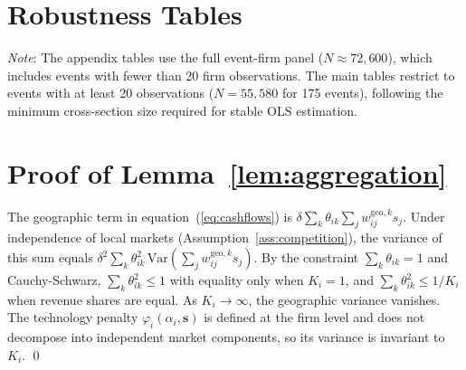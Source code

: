 \documentclass[12pt,a4paper]{article}
\begin{document}




\appendix
\section{Robustness Tables}\label{app:robustness}

\noindent\footnotesize\textit{Note}: The appendix tables use the full event-firm panel ($N \approx 72{,}600$), which includes events with fewer than 20 firm observations. The main tables restrict to events with at least 20 observations ($N = 55{,}580$ for 175 events), following the minimum cross-section size required for stable OLS estimation.\normalsize

\medskip











\section{Proof of Lemma~\ref{lem:aggregation}}\label{app:aggregation_proof}

The geographic term in equation~(\ref{eq:cashflows}) is $\delta \sum_k \theta_{ik} \sum_j w^{\text{geo},k}_{ij} s_j$. Under independence of local markets (Assumption~\ref{ass:competition}), the variance of this sum equals $\delta^2 \sum_k \theta_{ik}^2 \, \text{Var}(\sum_j w^{\text{geo},k}_{ij} s_j)$. By the constraint $\sum_k \theta_{ik} = 1$ and Cauchy-Schwarz, $\sum_k \theta_{ik}^2 \leq 1$ with equality only when $K_i = 1$, and $\sum_k \theta_{ik}^2 \leq 1/K_i$ when revenue shares are equal. As $K_i \to \infty$, the geographic variance vanishes. The technology penalty $\varphi_i(\alpha_i, \mathbf{s})$ is defined at the firm level and does not decompose into independent market components, so its variance is invariant to $K_i$. \qed
\end{document}
